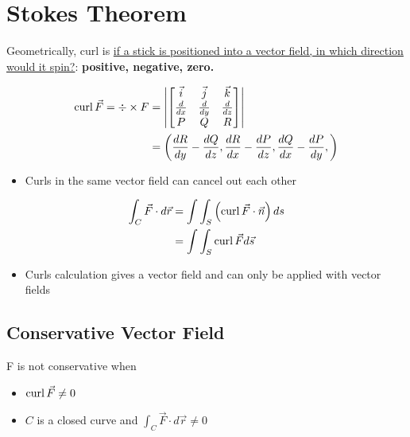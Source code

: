 \section{Stokes Theorem}

  Geometrically, curl is \ul{if a stick is positioned into a vector field,
  in which direction would it spin?}: \textbf{positive, negative, zero.}

  \begin{align}
    \operatorname{curl} \vec{F} = \div \times F &=
    \left|
      \begin{bmatrix}
        \vec{i} & \vec{j} & \vec{k} \\
        \frac{d}{dx} & \frac{d}{dy} & \frac{d}{dz} \\
        P & Q & R
      \end{bmatrix}
    \right| \\
    &=
    \left(
      \frac{dR}{dy} - \frac{dQ}{dz},
      \frac{dR}{dx} - \frac{dP}{dz},
      \frac{dQ}{dx} - \frac{dP}{dy},
    \right)
  \end{align}

  \begin{itemize}
    \item Curls in the same vector field can cancel out each other
  \end{itemize}

  \begin{align}
    \int_{C} \vec{F} \cdot d \vec{r}
    &= \int \int_{S} \left( \operatorname{curl} \vec{F} \cdot \vec{n} \right) ds \\
    &= \int \int_{S} \operatorname{curl}\vec{F} d\vec{s}
  \end{align}

  \begin{itemize}
    \item Curls calculation gives a vector field and can only be applied
    with vector fields
  \end{itemize}

  \subsection{Conservative Vector Field}

    F is not conservative when

    \begin{itemize}
      \item $ \operatorname{curl} \vec{F} \ne 0 $
      \item $ C $ is a closed curve and $ \int_{C} \vec{F} \cdot d \vec{r} \ne 0 $
    \end{itemize}